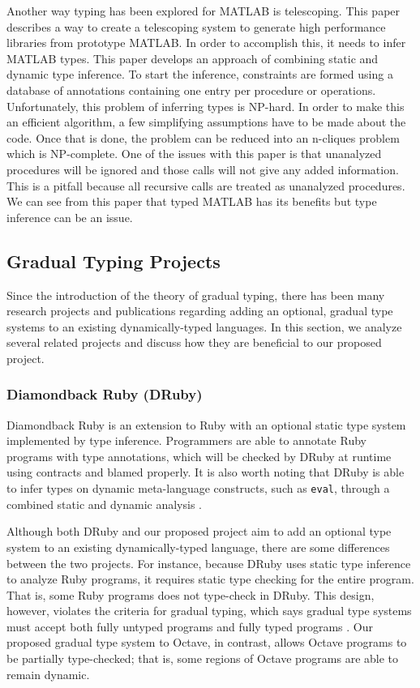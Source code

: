 Another way typing has been explored for MATLAB is telescoping. This paper \cite{chauhan2003type} describes a way to create a telescoping system to generate high performance libraries from prototype MATLAB. In order to accomplish this, it needs to infer MATLAB types. This paper develops an approach of combining static and dynamic type inference. To start the inference, constraints are formed using a database of annotations containing one entry per procedure or operations. Unfortunately, this problem of inferring types is NP-hard. In order to make this an efficient algorithm, a few simplifying assumptions have to be made about the code. Once that is done, the problem can be reduced into an n-cliques problem which is NP-complete. One of the issues with this paper is that unanalyzed procedures will be ignored and those calls will not give any added information. This is a pitfall because all recursive calls are treated as unanalyzed procedures. We can see from this paper that typed MATLAB has its benefits but type inference can be an issue.

\subsection{Gradual Typing Projects}
Since the introduction of the theory of gradual typing, there has been many research projects and publications regarding adding an optional, gradual type systems to an existing dynamically-typed languages. In this section, we analyze several related projects and discuss how they are beneficial to our proposed project.

\subsubsection{Diamondback Ruby (DRuby) \cite{furr2009combining}}
Diamondback Ruby is an extension to Ruby with an optional static type system implemented by type inference. Programmers are able to annotate Ruby programs with type annotations, which will be checked by DRuby at runtime using contracts and blamed properly. It is also worth noting that DRuby is able to infer types on dynamic meta-language constructs, such as {\tt eval}, through a combined static and dynamic analysis \cite{druby}.

Although both DRuby and our proposed project aim to add an optional type system to an existing dynamically-typed language, there are some differences between the two projects. For instance, because DRuby uses static type inference to analyze Ruby programs, it requires static type checking for the entire program. That is, some Ruby programs does not type-check in DRuby. This design, however, violates the criteria for gradual typing, which says gradual type systems must accept both fully untyped programs and fully typed programs \cite{siek2015refined}.  Our proposed gradual type system to Octave, in contrast, allows Octave programs to be partially type-checked; that is, some regions of Octave programs are able to remain dynamic.

